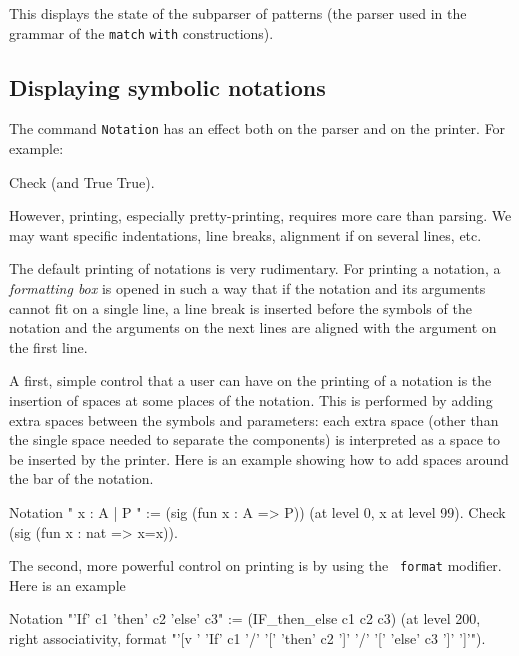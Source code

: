 This displays the state of the subparser of patterns (the parser
used in the grammar of the {\tt match} {\tt with} constructions).

\subsection{Displaying symbolic notations}

The command \texttt{Notation} has an effect both on the {\Coq} parser and
on the {\Coq} printer. For example:

\begin{coq_example}
Check (and True True).
\end{coq_example}

However, printing, especially pretty-printing, requires
more care than parsing. We may want specific indentations,
line breaks, alignment if on several lines, etc. 

The default printing of notations is very rudimentary. For printing a
notation, a {\em formatting box} is opened in such a way that if the
notation and its arguments cannot fit on a single line, a line break
is inserted before the symbols of the notation and the arguments on
the next lines are aligned with the argument on the first line.

A first, simple control that a user can have on the printing of a
notation is the insertion of spaces at some places of the
notation. This is performed by adding extra spaces between the symbols
and parameters: each extra space (other than the single space needed
to separate the components) is interpreted as a space to be inserted
by the printer. Here is an example showing how to add spaces around
the bar of the notation.

\begin{coq_example}
Notation "{{ x : A  |  P }}" := (sig (fun x : A => P))
  (at level 0, x at level 99).
Check (sig (fun x : nat => x=x)).
\end{coq_example}

The second, more powerful control on printing is by using the {\tt
format} modifier. Here is an example

\begin{small}
\begin{coq_example}
Notation "'If' c1 'then' c2 'else' c3" := (IF_then_else c1 c2 c3)
(at level 200, right associativity, format
"'[v   ' 'If'  c1 '/' '[' 'then'  c2  ']' '/' '[' 'else'  c3 ']' ']'").
\end{coq_example}
\end{small}

